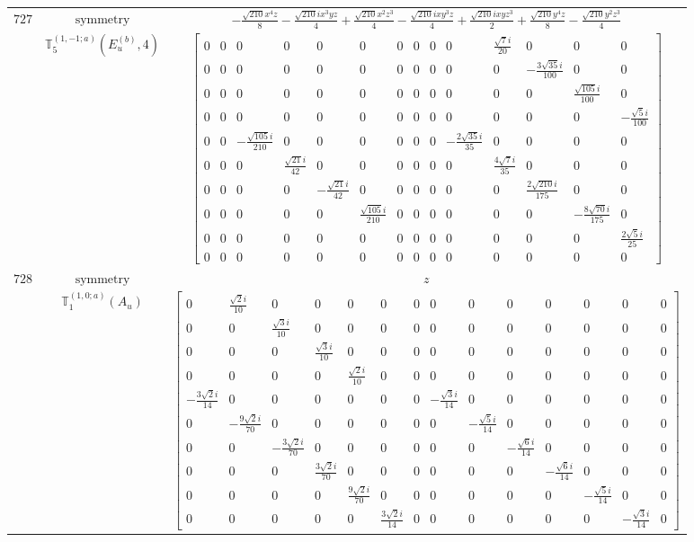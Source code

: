 \documentclass[fleqn,8pt,landscape]{jsarticle}
\begin{document}
\begin{longtable}{ccc}
$ 727 $ & $ \text{symmetry} $ & $ - \frac{\sqrt{210} x^{4} z}{8} - \frac{\sqrt{210} i x^{3} y z}{4} + \frac{\sqrt{210} x^{2} z^{3}}{4} - \frac{\sqrt{210} i x y^{3} z}{4} + \frac{\sqrt{210} i x y z^{3}}{2} + \frac{\sqrt{210} y^{4} z}{8} - \frac{\sqrt{210} y^{2} z^{3}}{4} $ \\
$  $ & $ \mathbb{T}_{5}^{(1,-1;a)}(E_{u}^{(b)},4) $ & $ \begin{bmatrix} 0 & 0 & 0 & 0 & 0 & 0 & 0 & 0 & 0 & 0 & \frac{\sqrt{7} i}{20} & 0 & 0 & 0 \\ 0 & 0 & 0 & 0 & 0 & 0 & 0 & 0 & 0 & 0 & 0 & - \frac{3 \sqrt{35} i}{100} & 0 & 0 \\ 0 & 0 & 0 & 0 & 0 & 0 & 0 & 0 & 0 & 0 & 0 & 0 & \frac{\sqrt{105} i}{100} & 0 \\ 0 & 0 & 0 & 0 & 0 & 0 & 0 & 0 & 0 & 0 & 0 & 0 & 0 & - \frac{\sqrt{5} i}{100} \\ 0 & 0 & - \frac{\sqrt{105} i}{210} & 0 & 0 & 0 & 0 & 0 & 0 & - \frac{2 \sqrt{35} i}{35} & 0 & 0 & 0 & 0 \\ 0 & 0 & 0 & \frac{\sqrt{21} i}{42} & 0 & 0 & 0 & 0 & 0 & 0 & \frac{4 \sqrt{7} i}{35} & 0 & 0 & 0 \\ 0 & 0 & 0 & 0 & - \frac{\sqrt{21} i}{42} & 0 & 0 & 0 & 0 & 0 & 0 & \frac{2 \sqrt{210} i}{175} & 0 & 0 \\ 0 & 0 & 0 & 0 & 0 & \frac{\sqrt{105} i}{210} & 0 & 0 & 0 & 0 & 0 & 0 & - \frac{8 \sqrt{70} i}{175} & 0 \\ 0 & 0 & 0 & 0 & 0 & 0 & 0 & 0 & 0 & 0 & 0 & 0 & 0 & \frac{2 \sqrt{5} i}{25} \\ 0 & 0 & 0 & 0 & 0 & 0 & 0 & 0 & 0 & 0 & 0 & 0 & 0 & 0 \end{bmatrix} $ \\ \hline
$ 728 $ & $ \text{symmetry} $ & $ z $ \\
$  $ & $ \mathbb{T}_{1}^{(1,0;a)}(A_{u}) $ & $ \begin{bmatrix} 0 & \frac{\sqrt{2} i}{10} & 0 & 0 & 0 & 0 & 0 & 0 & 0 & 0 & 0 & 0 & 0 & 0 \\ 0 & 0 & \frac{\sqrt{3} i}{10} & 0 & 0 & 0 & 0 & 0 & 0 & 0 & 0 & 0 & 0 & 0 \\ 0 & 0 & 0 & \frac{\sqrt{3} i}{10} & 0 & 0 & 0 & 0 & 0 & 0 & 0 & 0 & 0 & 0 \\ 0 & 0 & 0 & 0 & \frac{\sqrt{2} i}{10} & 0 & 0 & 0 & 0 & 0 & 0 & 0 & 0 & 0 \\ - \frac{3 \sqrt{2} i}{14} & 0 & 0 & 0 & 0 & 0 & 0 & - \frac{\sqrt{3} i}{14} & 0 & 0 & 0 & 0 & 0 & 0 \\ 0 & - \frac{9 \sqrt{2} i}{70} & 0 & 0 & 0 & 0 & 0 & 0 & - \frac{\sqrt{5} i}{14} & 0 & 0 & 0 & 0 & 0 \\ 0 & 0 & - \frac{3 \sqrt{2} i}{70} & 0 & 0 & 0 & 0 & 0 & 0 & - \frac{\sqrt{6} i}{14} & 0 & 0 & 0 & 0 \\ 0 & 0 & 0 & \frac{3 \sqrt{2} i}{70} & 0 & 0 & 0 & 0 & 0 & 0 & - \frac{\sqrt{6} i}{14} & 0 & 0 & 0 \\ 0 & 0 & 0 & 0 & \frac{9 \sqrt{2} i}{70} & 0 & 0 & 0 & 0 & 0 & 0 & - \frac{\sqrt{5} i}{14} & 0 & 0 \\ 0 & 0 & 0 & 0 & 0 & \frac{3 \sqrt{2} i}{14} & 0 & 0 & 0 & 0 & 0 & 0 & - \frac{\sqrt{3} i}{14} & 0 \end{bmatrix} $ \\ \hline

\end{longtable}
\end{document}
